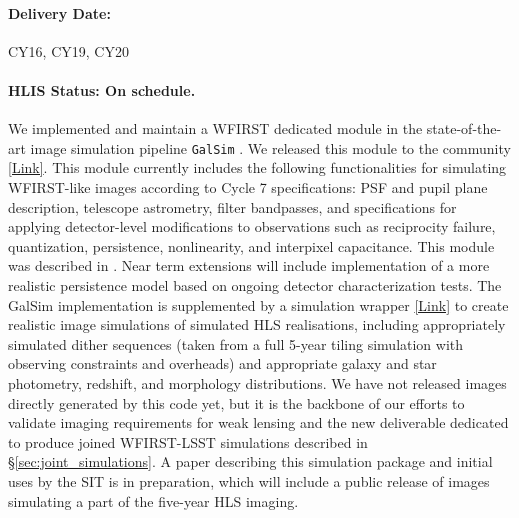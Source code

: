 \paragraph*{Delivery Date:} CY16, CY19, CY20

\paragraph*{HLIS Status: On schedule.} We implemented and maintain a
WFIRST dedicated module in the state-of-the-art image simulation
pipeline \texttt{GalSim} \citep{Rowe:2015}. We released this module to the community
\href{https://github.com/GalSim-developers/GalSim}{[Link]}. This module currently includes the following functionalities for simulating WFIRST-like images according to Cycle 7 specifications: PSF and pupil plane description, telescope astrometry, filter bandpasses, and specifications for applying detector-level modifications to observations such as reciprocity failure, quantization, persistence, nonlinearity, and interpixel capacitance. This module was described in \cite{Kannawadi2016}. Near term extensions will include implementation of a more realistic persistence model based on ongoing detector characterization tests. The GalSim implementation is supplemented by a simulation wrapper \href{https://github.com/matroxel/wfirst_imsim/}{[Link]} to create realistic image simulations of simulated HLS realisations, including appropriately simulated dither sequences (taken from a full 5-year tiling simulation with observing constraints and overheads) and appropriate galaxy and star photometry, redshift, and morphology distributions. We have not released images directly generated by this code yet, but it is the backbone of our efforts to validate imaging requirements for weak lensing and the new deliverable dedicated to produce joined WFIRST-LSST simulations described in \S\ref{sec:joint_simulations}. A paper describing this simulation package and initial uses by the SIT is in preparation, which will include a public release of images simulating a part of the five-year HLS imaging.

